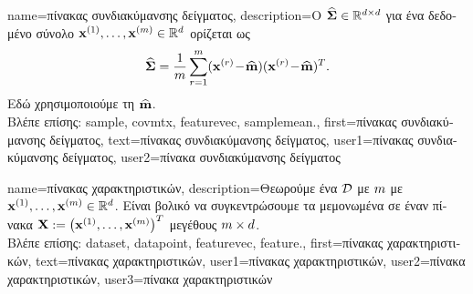 {name={\foreignlanguage{greek}{πίνακας συνδιακύμανσης δείγματος}}, 
	description={\foreignlanguage{greek}{Ο} 
		  $\widehat{\bf \Sigma} \in \mathbb{R}^{d \times d}$ 
		\foreignlanguage{greek}{για ένα δεδομένο σύνολο}  
		${\bf x}^{(1)}, \ldots, {\bf x}^{(m)} \in \mathbb{R}^{d}$ \foreignlanguage{greek}{ορίζεται ως}  
		$$\widehat{\bf \Sigma} = \frac{1}{m} \sum_{r=1}^{m} ({\bf x}^{(r)}\!-\!\widehat{{\bf m}}) ({\bf x}^{(r)}\!-\!\widehat{{\bf m}})^{T}.$$ 
		\foreignlanguage{greek}{Εδώ χρησιμοποιούμε τη}  $\widehat{{\bf m}}$.\\
		\foreignlanguage{greek}{Βλέπε επίσης:} \gls{sample}, \gls{covmtx}, \gls{featurevec}, \gls{samplemean}.},
	first={\foreignlanguage{greek}{πίνακας συνδιακύμανσης δείγματος}},
	text={\foreignlanguage{greek}{πίνακας συνδιακύμανσης δείγματος}},
	user1={\foreignlanguage{greek}{πίνακας συνδιακύμανσης δείγματος}}, %
	user2={\foreignlanguage{greek}{πίνακα συνδιακύμανσης δείγματος}} %
}

{name={\foreignlanguage{greek}{πίνακας χαρακτηριστικών}}, 
	description={\foreignlanguage{greek}{Θεωρούμε ένα}  $\mathcal{D}$ 
		\foreignlanguage{greek}{με} $m$  \foreignlanguage{greek}{με}  
		${\bf x}^{(1)}, \ldots, {\bf x}^{(m)} \in \mathbb{R}^{d}$. 
		\foreignlanguage{greek}{Εί\-ναι βολικό να συγκεντρώσουμε τα μεμονωμένα}  
		 \foreignlanguage{greek}{σε έναν πίνακα}  
		${\bf X} := \big({\bf x}^{(1)}, \ldots, {\bf x}^{(m)}\big)^{T}$ 
		\foreignlanguage{greek}{μεγέθους} $m \times d$.\\
		\foreignlanguage{greek}{Βλέπε επίσης:} \gls{dataset}, \gls{datapoint}, \gls{featurevec}, \gls{feature}.},
	first={\foreignlanguage{greek}{πίνακας χαρακτηριστικών}},
	text={\foreignlanguage{greek}{πίνακας χαρακτηριστικών}},
	user1={\foreignlanguage{greek}{πίνακας χαρακτηριστικών}}, %
  	user2={\foreignlanguage{greek}{πίνακα χαρακτηριστικών}}, %
	user3={\foreignlanguage{greek}{πίνακα χαρακτηριστικών}} %
}

